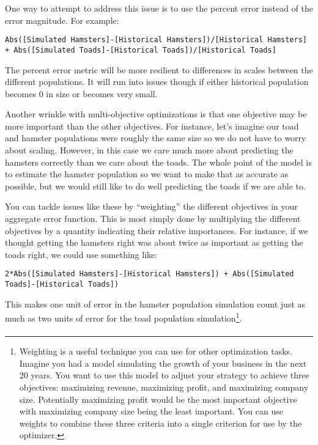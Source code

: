 \documentclass[]{memoir}
\begin{document}
One way to attempt to address this issue is to use the percent error
instead of the error magnitude. For example:

\lstinline!Abs([Simulated Hamsters]-[Historical Hamsters])/[Historical Hamsters] + Abs([Simulated Toads]-[Historical Toads])/[Historical Toads]!

The percent error metric will be more resilient to differences in scales
between the different populations. It will run into issues though if
either historical population becomes 0 in size or becomes very small.

Another wrinkle with multi-objective optimizations is that one objective
may be more important than the other objectives. For instance, let's
imagine our toad and hamster populations were roughly the same size so
we do not have to worry about scaling. However, in this case we care
much more about predicting the hamsters correctly than we care about the
toads. The whole point of the model is to estimate the hamster
population so we want to make that as accurate as possible, but we would
still like to do well predicting the toads if we are able to.

You can tackle issues like these by ``weighting'' the different
objectives in your aggregate error function. This is most simply done by
multiplying the different objectives by a quantity indicating their
relative importances. For instance, if we thought getting the hamsters
right was about twice as important as getting the toads right, we could
use something like:

\lstinline!2*Abs([Simulated Hamsters]-[Historical Hamsters]) + Abs([Simulated Toads]-[Historical Toads])!

This makes one unit of error in the hamster population simulation count
just as much as two units of error for the toad population
simulation\footnote{Weighting is a useful technique you can use for
  other optimization tasks. Imagine you had a model simulating the
  growth of your business in the next 20 years. You want to use this
  model to adjust your strategy to achieve three objectives: maximizing
  revenue, maximizing profit, and maximizing company size. Potentially
  maximizing profit would be the most important objective with
  maximizing company size being the least important. You can use weights
  to combine these three criteria into a single criterion for use by the
  optimizer.}.

\paragraph{}
\end{document}
